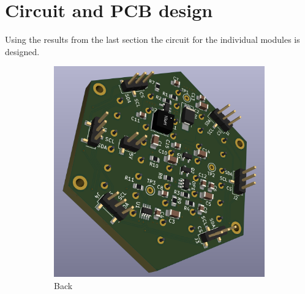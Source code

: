 \chapter{Circuit and PCB design}
%
Using the results from the last section the circuit for the individual modules is designed.
%




%
\begin{figure}[ht]
  \begin{subfigure}[b]{0.49\textwidth}
    \includegraphics[width=\textwidth]{src/assets/pictures/circuit/pcb_back.png}
    \caption{Back}
    \label{fig:pcb:back}
  \end{subfigure}
  \hfill
  \begin{subfigure}[b]{0.49\textwidth}

\end{subfigure}
\end{figure}
